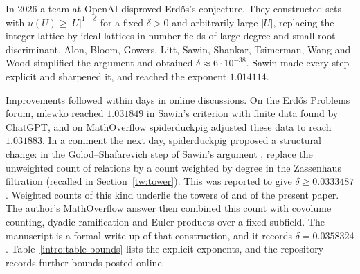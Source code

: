 In $2026$ a team at OpenAI \cite{OpenAI2026} disproved Erd\H{o}s's
conjecture. They constructed sets with $u(U)\ge|U|^{1+\delta}$ for a
fixed $\delta>0$ and arbitrarily large $|U|$, replacing the integer
lattice by ideal lattices in number fields of large degree and small
root discriminant. Alon, Bloom, Gowers, Litt, Sawin, Shankar, Tsimerman,
Wang and Wood \cite{Alon2026} simplified the argument and obtained
$\delta\approx6\cdot10^{-38}$. Sawin \cite{Sawin2026} made every step
explicit and sharpened it, and reached the exponent $1.014114$.

Improvements followed within days in online discussions. On the
Erd\H{o}s Problems forum, mlewko \cite{ErdosProblems90} reached
$1.031849$ in Sawin's criterion with finite data found by ChatGPT, and
on MathOverflow spiderduckpig \cite{SpiderduckpigMO2026} adjusted these
data to reach $1.031883$. In a comment the next day, spiderduckpig
proposed a structural change: in the Golod--Shafarevich step of Sawin's
argument \cite[Lemma~11]{Sawin2026}, replace the unweighted count of
relations by a count weighted by degree in the Zassenhaus filtration
(recalled in Section~\ref{tw:tower}). This was reported to give $\delta\ge0.0333487$
\cite{SpiderduckpigMO2026}. Weighted counts of this kind underlie the
towers of \cite{Naslund0358} and of the present paper. The author's
MathOverflow answer \cite{NaslundMO2026} then combined this count with
covolume counting, dyadic ramification and Euler products over a fixed
subfield. The manuscript \cite{Naslund0358} is a formal write-up of that
construction, and it records $\delta=0.0358324$.
Table~\ref{intro:table-bounds} lists the explicit exponents, and the
repository \cite{TaoConstants84a} records further bounds posted online.

